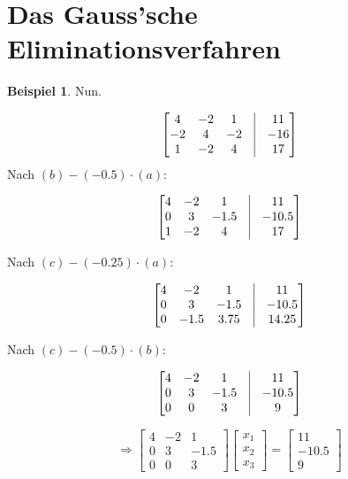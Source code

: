 \documentclass[11pt]{article} %
\theoremstyle{definition}
\newtheorem*{beispiel}{Beispiel}
\begin{document}
\section{Das Gauss'sche Eliminationsverfahren}

\begin{beispiel} Nun.

\[
\begin{bmatrix}
4 & -2 & 1 &\vline& 11 \\
-2 & 4 & -2 &\vline& -16 \\
1 & -2 & 4 &\vline& 17
\end{bmatrix}
\]
Nach $(b) - (-0.5)\cdot (a)$:

\[
\begin{bmatrix}
4 & -2 & 1 &\vline& 11 \\
0 & 3 & -1.5 &\vline& -10.5 \\
1 & -2 & 4 &\vline& 17
\end{bmatrix}
\]

Nach $(c) - (-0.25)\cdot (a)$:

\[
\begin{bmatrix}
4 & -2 & 1 &\vline& 11 \\
0 & 3 & -1.5 &\vline& -10.5 \\
0 & -1.5 & 3.75 &\vline&14.25
\end{bmatrix}
\]

Nach $(c) - (-0.5)\cdot (b)$:

\[
\begin{bmatrix}
4 & -2 & 1 &\vline& 11 \\
0 & 3 & -1.5 &\vline& -10.5 \\
0 & 0 & 3 &\vline&9
\end{bmatrix}
\]

\[
\Rightarrow \begin{bmatrix}
4 & -2 & 1  \\
0 & 3 & -1.5  \\
0 & 0 & 3 
\end{bmatrix} \begin{bmatrix}
x_1 \\ x_2 \\ x_3
\end{bmatrix} = \begin{bmatrix}
 11 \\
 -10.5 \\
 9
\end{bmatrix}
\]

\end{beispiel}
\end{document}
